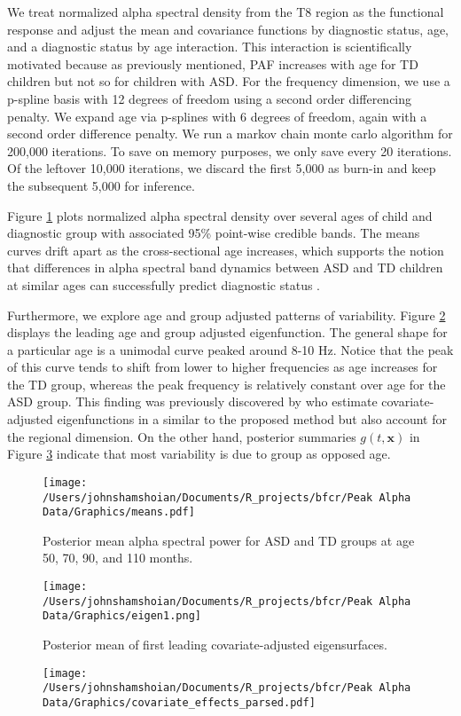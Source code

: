 \documentclass[useAMS,referee,usenatbib]{biom}
\begin{document}
We treat normalized alpha spectral density from the T8 region as the functional response and adjust the mean and covariance functions by diagnostic status, age, and a diagnostic status by age interaction. This interaction is scientifically motivated because as previously mentioned, PAF increases with age for TD children but not so for children with ASD. For the frequency dimension, we use a p-spline basis with 12 degrees of freedom using a second order differencing penalty. We expand age via p-splines with 6 degrees of freedom, again with a second order difference penalty. We run a markov chain monte carlo algorithm for 200,000 iterations. To save on memory purposes, we only save every 20 iterations. Of the leftover 10,000 iterations, we discard the first 5,000 as burn-in and keep the subsequent 5,000 for inference.  

Figure \ref{fig:asd_means} plots normalized alpha spectral density over several ages of child and diagnostic group with associated 95\% point-wise credible bands. The means curves drift apart as the cross-sectional age increases, which supports the notion that differences in alpha spectral band dynamics between ASD and TD children at similar ages can successfully predict diagnostic status \cite{Scheffler2019}. 

Furthermore, we explore age and group adjusted patterns of variability. Figure \ref{fig:asd_eigen1} displays the leading age and group adjusted eigenfunction. The general shape for a particular age is a unimodal curve peaked around 8-10 Hz. Notice that the peak of this curve tends to shift from lower to higher frequencies as age increases for the TD group, whereas the peak frequency is relatively constant over age for the ASD group. This finding was previously discovered by \cite{Scheffler2020} who estimate covariate-adjusted eigenfunctions in a similar to the proposed method but also account for the regional dimension. On the other hand, posterior summaries $g(t, \mathbf{x})$ in Figure \ref{fig:asd_g} indicate that most variability is due to group as opposed age.

\begin{figure}
	\centering
	\texttt{[image: /Users/johnshamshoian/Documents/R\_projects/bfcr/Peak Alpha Data/Graphics/means.pdf]}
	\label{fig:asd_means}
	\caption{Posterior mean alpha spectral power for ASD and TD groups at age 50, 70, 90, and 110 months.}
\end{figure}
\begin{figure}
	\centering
	\texttt{[image: /Users/johnshamshoian/Documents/R\_projects/bfcr/Peak Alpha Data/Graphics/eigen1.png]}
	\label{fig:asd_eigen1}
	\caption{Posterior mean of first leading covariate-adjusted eigensurfaces.}
\end{figure}
\begin{figure}
	\centering
	\texttt{[image: /Users/johnshamshoian/Documents/R\_projects/bfcr/Peak Alpha Data/Graphics/covariate\_effects\_parsed.pdf]}
	\label{fig:asd_g}
\end{figure}
\end{document}
